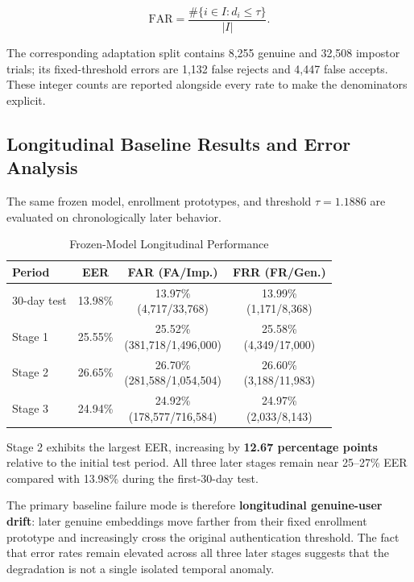 \documentclass[conference]{IEEEtran}
\begin{document}
\begin{equation}
\mathrm{FAR}=
\frac{\#\{i\in I:d_i\leq\tau\}}{|I|}.
\end{equation}

The corresponding adaptation split contains 8,255 genuine and 32,508 impostor trials; its fixed-threshold errors are 1,132 false rejects and 4,447 false accepts. These integer counts are reported alongside every rate to make the denominators explicit.


\subsection{Longitudinal Baseline Results and Error Analysis}

The same frozen model, enrollment prototypes, and threshold $\tau=1.1886$ are evaluated on chronologically later behavior.

\begin{table}[htbp]
\caption{Frozen-Model Longitudinal Performance}
\label{tab:longitudinal}
\centering
\scriptsize
\begin{tabular}{lccc}
\toprule
\textbf{Period} & \textbf{EER} & \textbf{FAR (FA/Imp.)} & \textbf{FRR (FR/Gen.)}\\
\midrule
30-day test & 13.98\% & \shortstack{13.97\%\\(4,717/33,768)} & \shortstack{13.99\%\\(1,171/8,368)}\\
Stage 1 & 25.55\% & \shortstack{25.52\%\\(381,718/1,496,000)} & \shortstack{25.58\%\\(4,349/17,000)}\\
Stage 2 & 26.65\% & \shortstack{26.70\%\\(281,588/1,054,504)} & \shortstack{26.60\%\\(3,188/11,983)}\\
Stage 3 & 24.94\% & \shortstack{24.92\%\\(178,577/716,584)} & \shortstack{24.97\%\\(2,033/8,143)}\\
\bottomrule
\end{tabular}
\end{table}

Stage 2 exhibits the largest EER, increasing by \textbf{12.67 percentage points} relative to the initial test period. All three later stages remain near 25--27\% EER compared with 13.98\% during the first-30-day test.

The primary baseline failure mode is therefore \textbf{longitudinal genuine-user drift}: later genuine embeddings move farther from their fixed enrollment prototype and increasingly cross the original authentication threshold. The fact that error rates remain elevated across all three later stages suggests that the degradation is not a single isolated temporal anomaly.
\end{document}

